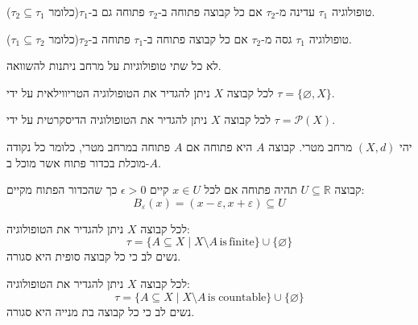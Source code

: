 \documentclass{tstextbook}
\begin{document}
\begin{definition}
טופולוגיה \(\tau_{1}\) עדינה מ-\(\tau_{2}\) אם כל קבוצה פתוחה ב-\(\tau_{2}\) פתוחה גם ב-\(\tau_{1}\)(כלומר \(\tau_{2}\subseteq \tau_{1}\)).

\end{definition}
\begin{definition}
טופולוגיה \(\tau_{1}\) גסה מ-\(\tau_{2}\) אם כל קבוצה פתוחה ב-\(\tau_{1}\) פתוחה ב-\(\tau_{2}\)(כלומר \(\tau_{1}\subseteq \tau_{2}\)).

\end{definition}
\begin{remark}
לא כל שתי טופולוגיות על מרחב ניתנות להשוואה.

\end{remark}
\begin{example}
לכל קבוצה \(X\) ניתן להגדיר את הטופולוגיה הטריווילאית על ידי \(\tau=\{ \varnothing,X \}\).

\end{example}
\begin{example}
לכל קבוצה \(X\) ניתן להגדיר את הטופולוגיה הדיסקרטית על ידי \(\tau=\mathcal{P}(X)\).

\end{example}
\begin{definition}
יהי \((X,d)\) מרחב מטרי. קבוצה \(A\) היא פתוחה אם \(A\) פתוחה במרחב מטרי, כלומר כל נקודה מוכלת בכדור פתוח אשר מוכל ב-\(A\).

\end{definition}
\begin{example}
קבוצה \(U\subseteq \mathbb{R}\) תהיה פתוחה אם לכל \(x \in U\) קיים \(\epsilon>0\) כך שהכדור הפתוח מקיים:
$$B_{\varepsilon}(x)=(x-\varepsilon,x+\varepsilon)\subseteq U$$

\end{example}
\begin{example}
לכל קבוצה \(X\) ניתן להגדיר את הטופולוגיה:
$$\tau=\{A\subseteq X\mid X\setminus A\,\mathrm{is\,finite}\}\cup\{\varnothing \}$$
נשים לב כי כל קבוצה סופית היא סגורה.

\end{example}
\begin{example}
לכל קבוצה \(X\) ניתן להגדיר את הטופולוגיה:
$$\tau=\{A\subseteq X\mid X\setminus A\,\mathrm{is\;countable}\}\cup\{\varnothing \}$$
נשים לב כי כל קבוצה בת מנייה היא סגורה.

\end{example}
\end{document}
